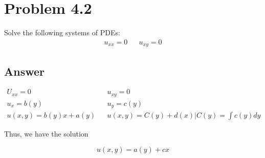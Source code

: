 \documentclass{article}
\begin{document}
\section*{Problem 4.2}

Solve the following systems of PDEs:
\begin{align*} u_{xx} = 0 && u_{xy} =0 \end{align*}

\subsection*{Answer}

\begin{align*}
U_{xx} = 0 && u_{xy}=0\\
u_x = b(y) && u_{y} = c(y)\\
u(x,y) = b(y)x + a(y) && u(x,y) = C(y) + d(x)\Bigr|C(y) = \int c(y) dy
\end{align*}

Thus, we have the solution

$$u(x,y) = a(y) + cx$$
\end{document}
